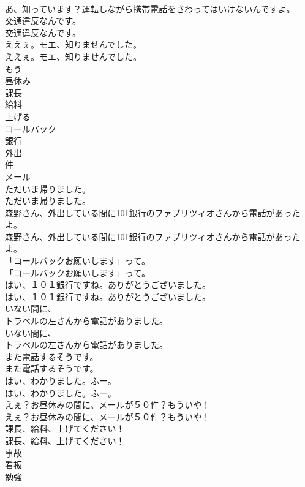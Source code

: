 \documentclass[8pt]{extreport}
\begin{document}
\begin{CJK}{UTF8}{min}
\\	あ、知っています？運転しながら携帯電話をさわってはいけないんですよ。 
\\	交通違反なんです。	
\\	交通違反なんです。 
\\	ええぇ。モエ、知りませんでした。	
\\	ええぇ。モエ、知りませんでした。 
\\	もう
\\	昼休み
\\	課長
\\	給料
\\	上げる
\\	コールバック
\\	銀行
\\	外出
\\	件
\\	メール
\\	ただいま帰りました。
\\	ただいま帰りました。
\\	森野さん、外出している間に101銀行のファブリツィオさんから電話があったよ。	
\\	森野さん、外出している間に101銀行のファブリツィオさんから電話があったよ。 
\\	「コールバックお願いします」って。	
\\	「コールバックお願いします」って。 
\\	はい、１０１銀行ですね。ありがとうございました。	
\\	はい、１０１銀行ですね。ありがとうございました。 
\\	いない間に、
\\	トラベルの左さんから電話がありました。	
\\	いない間に、
\\	トラベルの左さんから電話がありました。 
\\	また電話するそうです。	
\\	また電話するそうです。 
\\	はい、わかりました。ふー。	
\\	はい、わかりました。ふー。 
\\	えぇ？お昼休みの間に、メールが５０件？もういや！	
\\	えぇ？お昼休みの間に、メールが５０件？もういや！ 
\\	課長、給料、上げてください！	
\\	課長、給料、上げてください！ 
\\	事故
\\	看板
\\	勉強

\end{CJK}
\end{document}
